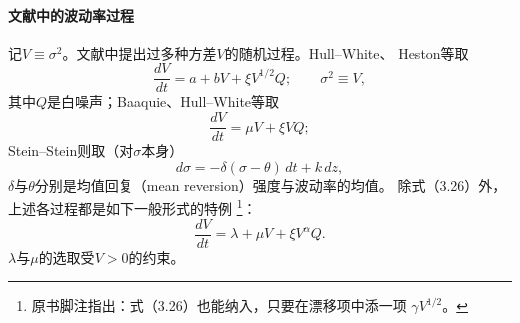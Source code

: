 \paragraph{文献中的波动率过程}
记$V\equiv\sigma^{2}$。文献中提出过多种方差$V$的随机过程。Hull--White、
Heston等取
\begin{equation*}
\frac{dV}{dt}=a+bV+\xi V^{1/2}Q;\qquad \sigma^{2}\equiv V,
\end{equation*}
其中$Q$是白噪声；Baaquie、Hull--White等取
\begin{equation*}
\frac{dV}{dt}=\mu V+\xi VQ;
\end{equation*}
Stein--Stein则取（对$\sigma$本身）
\begin{equation*}
d\sigma=-\delta(\sigma-\theta)\,dt+k\,dz,
\tag{3.26}
\end{equation*}
$\delta$与$\theta$分别是均值回复（mean reversion）强度与波动率的均值。
除式（3.26）外，上述各过程都是如下一般形式的特例
\footnote{原书脚注指出：式（3.26）也能纳入，只要在漂移项中添一项
$\gamma V^{1/2}$。}：
\begin{equation*}
\frac{dV}{dt}=\lambda+\mu V+\xi V^{\alpha}Q.
\tag{3.27}
\end{equation*}
$\lambda$与$\mu$的选取受$V>0$的约束。

